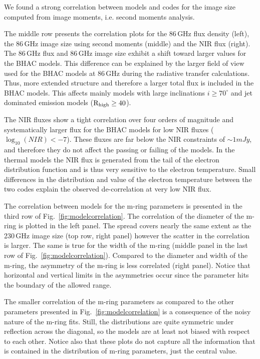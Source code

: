 We found a strong correlation between models and codes for the image size computed from image moments, i.e. second moments analysis.

The middle row presents the correlation plots for the 86\,GHz flux density (left), the 86\,GHz image size using second moments (middle) and the NIR flux (right). The 86\,GHz flux and 86\,GHz image size exhibit a shift toward larger values for the BHAC models. This difference can be explained by the larger field of view used for the BHAC models at 86\,GHz during the radiative transfer calculations. Thus, more extended structure and therefore a larger total flux is included in the BHAC models. This affects mainly models with large inclinations $i\geq70^\circ$ and jet dominated emission models ($\rm{R}_{\rm high}\geq 40$).

The NIR fluxes show a tight correlation over four orders of magnitude and systematically larger flux for the BHAC models for low NIR fluxes ($\log_{10}(NIR)<-7$). These fluxes are far below the NIR constraints of $\sim 1mJy$, and therefore they do not affect the passing or failing of the models. In the thermal models the NIR flux is generated from the tail of the electron distribution function and is thus very sensitive to the electron temperature. Small differences in the distribution and value of the electron temperature between the two codes explain the observed de-correlation at very low NIR flux. 

The correlation between models for the m-ring parameters is presented in the third row of Fig.~\ref{fig:modelcorrelation}. The correlation of the diameter of the m-ring is plotted in the left panel. The spread covers nearly the same extent as the 230\,GHz image size (top row, right panel) however the scatter in the correlation is larger.  The same is true for the width of the m-ring (middle panel in the last row of Fig.~\ref{fig:modelcorrelation}). Compared to the diameter and width of the m-ring, the asymmetry of the m-ring is less correlated (right panel). Notice that horizontal and vertical limits in the asymmetries occur since the parameter hits the boundary of the allowed range.

The smaller correlation of the m-ring parameters as compared to the other parameters presented in Fig.~\ref{fig:modelcorrelation} is a consequence of the noisy nature of the m-ring fits.  Still, the distributions are quite symmetric under reflection across the diagonal, so the models are at least not biased with respect to each other.  Notice also that these plots do not capture all the information that is contained in the distribution of m-ring parameters, just the central value.   

